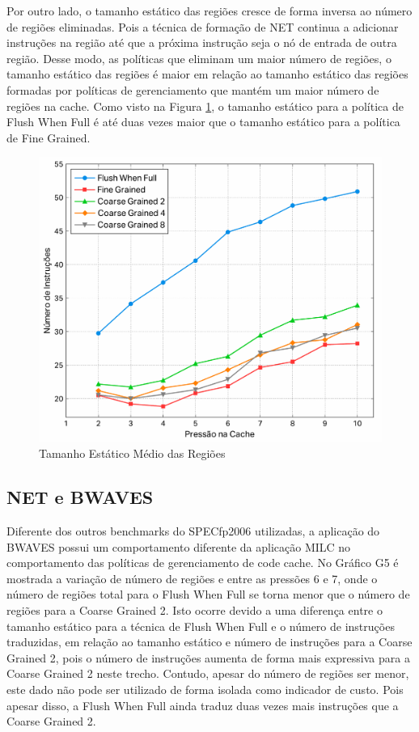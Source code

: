 \documentclass[11pt,twoside]{article}
\begin{document}
Por outro lado, o tamanho estático das regiões cresce de forma inversa ao número de regiões eliminadas. Pois a técnica de formação de NET continua a adicionar instruções na região até que a próxima instrução seja o nó de entrada de outra região. Desse modo, as políticas que eliminam um maior número de regiões, o tamanho estático das regiões é maior em relação ao tamanho estático das regiões formadas por políticas de gerenciamento que mantém um maior número de regiões na cache. Como visto na Figura \ref{fig:avg-reg-net}, o tamanho estático para a política de Flush When Full é até duas vezes maior que o tamanho estático para a política de Fine Grained. 

\begin{figure}[!ht]
	\centering
\includegraphics[scale=0.4]{./figs/milc-average-reg}
\caption{Tamanho Estático Médio das Regiões}
\label{fig:avg-reg-net}
\end{figure}

\subsection{NET e BWAVES}

Diferente dos outros benchmarks do SPECfp2006 utilizadas, a aplicação do BWAVES possui um comportamento diferente da aplicação MILC no comportamento das políticas de gerenciamento de code cache. No Gráfico G5 é mostrada a variação de número de regiões e entre as pressões 6 e 7, onde o número de regiões total para o Flush When Full se torna menor que o número de regiões para a Coarse Grained 2. Isto ocorre devido a uma diferença entre o tamanho estático para a técnica de Flush When Full e o número de instruções traduzidas, em relação ao tamanho estático e número de instruções para a Coarse Grained 2, pois o número de instruções aumenta de forma mais expressiva para a Coarse Grained 2 neste trecho. Contudo, apesar do número de regiões ser menor, este dado não pode ser utilizado de forma isolada como indicador de custo. Pois apesar disso, a Flush When Full ainda traduz duas vezes mais instruções que a Coarse Grained 2.
\end{document}
